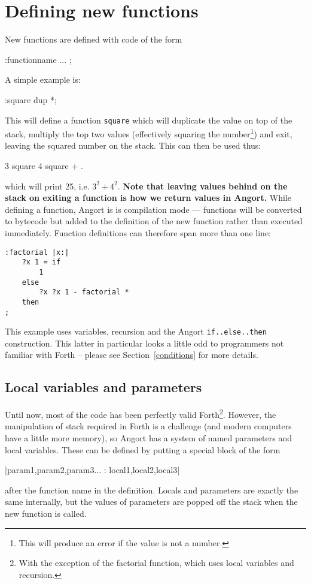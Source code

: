 \section{Defining new functions}
New functions are defined with code of the form
\begin{v}
:functionname ... ;
\end{v}
A simple example is:
\begin{v}
:square dup *;
\end{v}
This will define a function \texttt{square} which will duplicate
the value on top of the stack, multiply the top two values
(effectively squaring the number\footnote{This will produce
an error if the value is not a number.}) and exit, leaving the
squared number on the stack. This can then be used thus:
\begin{v}
3 square 4 square + .
\end{v}
which will print 25, i.e. $3^2+4^2$. \textbf{Note that leaving values behind
on the stack on exiting a function is how we return values in Angort.}
While defining a function, Angort is is compilation mode --- functions will
be converted to bytecode but added to the definition of the new function
rather than executed immediately. Function definitions can therefore span
more than one line:
\begin{lstlisting}
:factorial |x:|
    ?x 1 = if
        1
    else
        ?x ?x 1 - factorial *
    then
;  
\end{lstlisting}
This example uses variables, recursion and the Angort \texttt{if..else..then} construction.
This latter in particular looks a little odd to programmers not familiar with Forth -- please
see Section~\ref{conditions} for more details.


\subsection{Local variables and parameters}
Until now, most of the code has been perfectly valid Forth\footnote{With
the exception of the factorial function, which uses local variables
and recursion.}. However, the manipulation of
stack required in Forth is a challenge (and modern computers
have a little more memory), so Angort has a system of named
parameters and local variables. These can be defined by
putting a special block of the form
\begin{v}
|param1,param2,param3... : local1,local2,local3|
\end{v}
after the function name in the definition. Locals and parameters are
exactly the same internally, but the values of parameters are popped
off the stack when the new function is called. 

